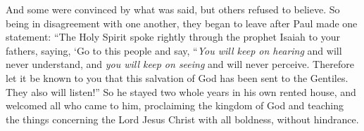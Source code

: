\begin{biblechapter}
\verse And some were convinced by what was said, but others refused to believe.
\verse So being in disagreement with one another, they began to leave after Paul made one statement: “The Holy Spirit spoke rightly through the prophet Isaiah to your fathers,
\verse saying,
\verse ‘Go to this people and say, 
“\textit{You will keep on hearing} and will never understand, 
and \textit{you will keep on seeing} and will never perceive.
\verse Therefore let it be known to you that this salvation of God has been sent to the Gentiles. They also will listen!”
\verse So he stayed two whole years in his own rented house, and welcomed all who came to him,
\verse proclaiming the kingdom of God and teaching the things concerning the Lord Jesus Christ with all boldness, without hindrance.
\end{biblechapter}

